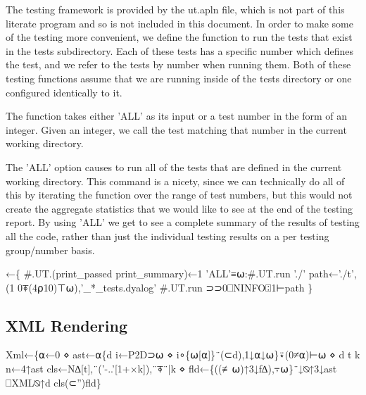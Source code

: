 \documentclass{article}%
\begin{document}
The testing framework is provided by the {\Tt{}ut.apln\nwendquote} file,
which is not part of this literate program and so is not included in 
this document. 
In order to make some of the testing more convenient, 
we define the function {\Tt{}\nwendquote} to run the tests 
that exist in the {\Tt{}tests{\nwbackslash}\nwendquote} subdirectory.
Each of these tests has a specific number which defines the test,
and we refer to the tests by number when running them.
Both of these testing functions assume that we are running inside 
of the {\Tt{}tests{\nwbackslash}\nwendquote} directory or one configured identically to it.

The {\Tt{}\nwendquote} function takes either {\Tt{}'ALL'\nwendquote} as its input or a test 
number in the form of an integer. 
Given an integer, we call the test matching that number in the 
current working directory.

The {\Tt{}'ALL'\nwendquote} option causes {\Tt{}\nwendquote} to run all of the tests that are 
defined in the current working directory.
This command is a nicety, since we can technically do all of this 
by iterating the {\Tt{}\nwendquote} function over the range of test numbers,
but this would not create the aggregate statistics that we would 
like to see at the end of the testing report. 
By using {\Tt{}'ALL'\nwendquote} we get to see a complete summary of the 
results of testing all the code,
rather than just the individual testing results on a per testing 
group/number basis.

\nwenddocs{}\endmoddef\nwstartdeflinemarkup\nwenddeflinemarkup
{}←\{
  #.UT.(print_passed print_summary)←1
  'ALL'≡⍵:#.UT.run './'
  path←'./t',(1 0⍕(4⍴10)⊤⍵),'_*_tests.dyalog'
  #.UT.run ⊃⊃0⎕NINFO⍠1⊢path
\}
\eatline
{}\nwendcode{}\nwdocspar
\subsection{XML Rendering}

\nwenddocs{}\endmoddef\nwstartdeflinemarkup{}\nwenddeflinemarkup
Xml←\{⍺←0 ⋄ ast←⍺\{d i←P2D⊃⍵ ⋄ i∘\{⍵[⍺]\}¨(⊂d),1↓⍺↓⍵\}⍣(0≠⍺)⊢⍵ ⋄ d t k n←4↑ast
  cls←N∆[t],¨('-..'[1+×k]),¨⍕¨|k ⋄ fld←\{((≢⍵)↑3↓f∆),⍪⍵\}¨↓⍉↑3↓ast
  ⎕XML⍉↑d cls(⊂'')fld\}
\nwendcode{}\nwdocspar
\end{document}

